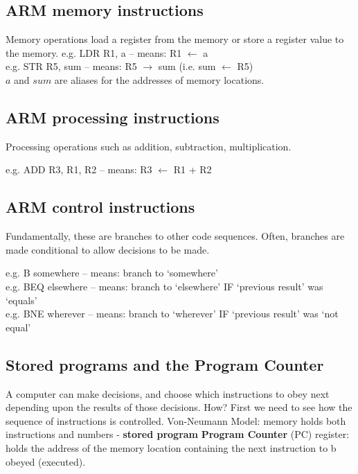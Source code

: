 \documentclass{article}
\begin{document}
\subsection{ARM memory instructions}
Memory operations load a register from the memory or store a register value to the memory.
e.g. LDR R1, a – means: R1 \(\leftarrow\) a\\
e.g. STR R5, sum – means: R5 \(\rightarrow\) sum (i.e. sum \(\leftarrow\) R5)\\

$a$ and $sum$ are aliases for the addresses of memory locations.

\subsection{ARM processing instructions}
Processing operations such as addition, subtraction, multiplication.

e.g. ADD R3, R1, R2 – means: R3 \(\leftarrow\) R1 + R2

\subsection{ARM control instructions}
Fundamentally, these are branches to other code sequences. Often, branches are made conditional to allow decisions to be made.

e.g. B somewhere – means: branch to ‘somewhere’\\
e.g. BEQ elsewhere – means: branch to ‘elsewhere’ IF ‘previous result’ was ‘equals’\\
e.g. BNE wherever – means: branch to ‘wherever’ IF ‘previous result’ was ‘not equal’\\

\subsection{Stored programs and the Program Counter}
A computer can make decisions, and choose which instructions to obey next depending upon the results of those decisions. How? First we need to see how the sequence of instructions is controlled. Von-Neumann Model: memory holds both instructions and numbers - \textbf{stored program} \textbf{Program Counter} (PC) register: holds the address of the memory location containing the next instruction to b obeyed (executed).
\end{document}
